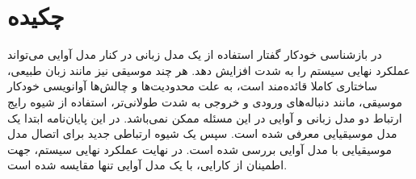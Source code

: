 \chapter*{چکیده}
در بازشناسی خودکار گفتار استفاده از یک مدل زبانی در کنار مدل آوایی می‌تواند
عملکرد نهایی سیستم را به شدت افزایش دهد. هر چند موسیقی نیز مانند زبان طبیعی،
ساختاری کاملا قائده‌مند است، به علت محدودیت‌ها و چالش‌ها آوانویسی خودکار موسیقی،
مانند دنباله‌های ورودی و خروجی به شدت طولانی‌تر، استفاده از شیوه رایج ارتباط دو
مدل زبانی و آوایی در این مسئله ممکن نمی‌باشد. در این پایان‌نامه ابتدا یک مدل
موسیقیایی معرفی شده است. سپس یک شیوه ارتباطی جدید برای اتصال مدل موسیقیایی با
مدل آوایی بررسی شده است. در نهایت عملکرد نهایی سیستم، جهت اطمینان از کارایی، با
یک مدل آوایی تنها مقایسه شده است.